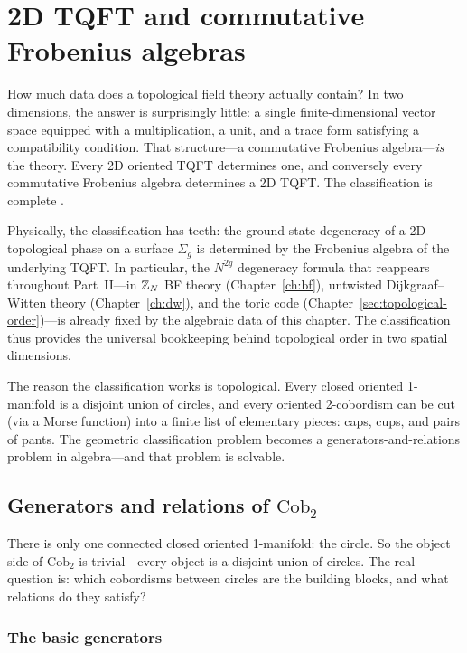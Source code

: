 \chapter{2D TQFT and commutative Frobenius algebras}\label{ch:frobenius}

How much data does a topological field theory actually contain?  In two dimensions, the answer is surprisingly little: a single finite-dimensional vector space equipped with a multiplication, a unit, and a trace form satisfying a compatibility condition.  That structure---a commutative Frobenius algebra---\emph{is} the theory.  Every 2D oriented TQFT determines one, and conversely every commutative Frobenius algebra determines a 2D TQFT.  The classification is complete \cite{Kock2004Frobenius}.

Physically, the classification has teeth: the ground-state degeneracy of a 2D topological phase on a surface $\Sigma_g$ is determined by the Frobenius algebra of the underlying TQFT. In particular, the $N^{2g}$ degeneracy formula that reappears throughout Part~II---in $\mathbb{Z}_N$ BF theory (Chapter~\ref{ch:bf}), untwisted Dijkgraaf--Witten theory (Chapter~\ref{ch:dw}), and the toric code (Chapter~\ref{sec:topological-order})---is already fixed by the algebraic data of this chapter. The classification thus provides the universal bookkeeping behind topological order in two spatial dimensions.

The reason the classification works is topological.  Every closed oriented 1-manifold is a disjoint union of circles, and every oriented 2-cobordism can be cut (via a Morse function) into a finite list of elementary pieces: caps, cups, and pairs of pants.  The geometric classification problem becomes a generators-and-relations problem in algebra---and that problem is solvable.

\section{Generators and relations of \texorpdfstring{$\mathrm{Cob}_2$}{Cob2}}\label{sec:cob2-generators}

There is only one connected closed oriented 1-manifold: the circle.  So the object side of $\mathrm{Cob}_2$ is trivial---every object is a disjoint union of circles.  The real question is: which cobordisms between circles are the building blocks, and what relations do they satisfy?

\subsection{The basic generators}

